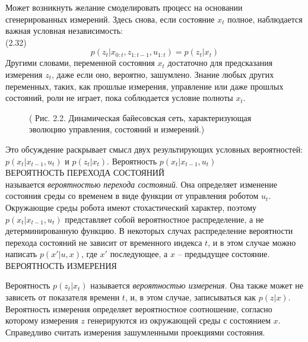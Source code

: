 \documentclass[10pt,a4paper]{article}
\begin{document}
 Может возникнуть желание смоделировать процесс на основании сгенерированных измерений. Здесь снова, если состояние $x_t$ полное, наблюдается важная условная независимость:\\

 (2.32) $$p(z_t | x_{0:t},z_{1:t-1}, u_{1:t}) = p(z_t | x_t)$$
 Другими словами, переменной состояния $x_t$ достаточно для предсказания измерения $z_t$, даже если оно, вероятно, зашумлено. Знание любых других переменных, таких, как прошлые измерения, управление или даже прошлых состояний, роли не играет, пока соблюдается условие полноты $x_t$.\\ 
 \begin{figure}[h]
 	\caption{ ( Рис. 2.2. Динамическая байесовская сеть, характеризующая эволюцию управления, состояний и измерений.)}
 	\label{fig:22orig}
 \end{figure}
  
 Это обсуждение раскрывает смысл двух результирующих условных вероятностей: $p(x_t | x_{t-1}, u_t)$ и $p(z_t | x_t)$. Вероятность $p(x_t | x_{t-1}, u_t)$\\
 ВЕРОЯТНОСТЬ
 ПЕРЕХОДА СОСТОЯНИЙ\\
 называется \textit{вероятностью перехода состояний}. Она определяет изменение состояния среды со временем в виде функции от управления роботом $u_t$. Окружающие среды робота имеют стохастический характер, поэтому $p(x_t | x_{t-1}, u_t)$ представляет собой вероятностное распределение, а не детерминированную функцию. В некоторых случах распределение вероятности перехода состояний не зависит от временного индекса $t$, и в этом случае можно написать $p(x' | u, x)$, где $x'$ последующее, а $x$ – предыдущее состояние.\\
 ВЕРОЯТНОСТЬ ИЗМЕРЕНИЯ 
  
 Вероятность $p(z_t | x_t)$ называется \textit{вероятностью измерения}. Она также может не зависеть от показателя времени $t$, и, в этом случае, записываться как $p(z |x)$. Вероятность измерения определяет вероятностное соотношение, согласно которому измерения $z$ генерируются из окружающей среды с состоянием $x$. Справедливо считать измерения зашумленными проекциями состояния.
  
\end{document}
